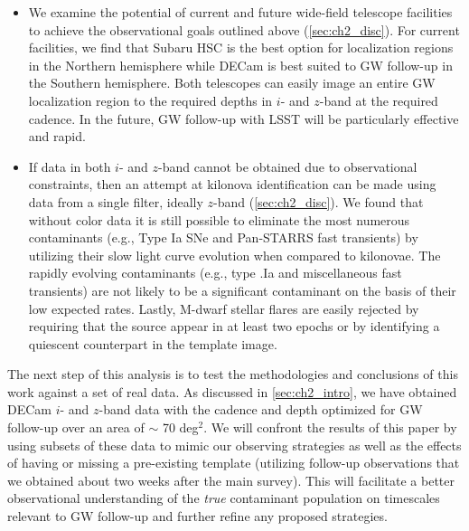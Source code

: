 \begin{itemize}
\clearpage
\item We examine the potential of current and future wide-field telescope facilities to achieve the observational goals outlined above (\cref{sec:ch2_disc}). For current facilities, we find that Subaru HSC is the best option for localization regions in the Northern hemisphere while DECam is best suited to GW follow-up in the Southern hemisphere. Both telescopes can easily image an entire GW localization region to the required depths in $i$- and $z$-band at the required cadence. In the future, GW follow-up with LSST will be particularly effective and rapid.
\item  If data in both $i$- and $z$-band cannot be obtained due to observational constraints, then an attempt at kilonova identification can be made using data from a single filter, ideally $z$-band (\cref{sec:ch2_disc}). We found that without color data it is still possible to eliminate the most numerous contaminants (e.g., Type Ia SNe and Pan-STARRS fast transients) by utilizing their slow light curve evolution when compared to kilonovae. The rapidly evolving contaminants (e.g., type .Ia and miscellaneous fast transients) are not likely to be a significant contaminant on the basis of their low expected rates. Lastly, M-dwarf stellar flares are easily rejected by requiring that the source appear in at least two epochs or by identifying a quiescent counterpart in the template image.
\end{itemize}

\clearpage
The next step of this analysis is to test the methodologies and conclusions of this work against a set of real data. As discussed in \cref{sec:ch2_intro}, we have obtained DECam $i$- and $z$-band data with the cadence and depth optimized for GW follow-up over an area of $\sim$ 70 deg$^2$. We will confront the results of this paper by using subsets of these data to mimic our observing strategies as well as the effects of having or missing a pre-existing template (utilizing follow-up observations that we obtained about two weeks after the main survey). This will facilitate a better observational understanding of the {\em true} contaminant population on timescales relevant to GW follow-up and further refine any proposed strategies.

